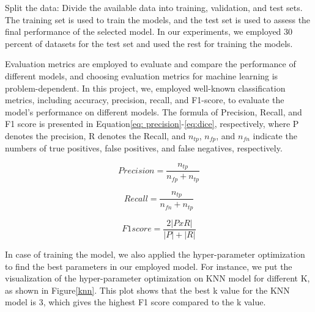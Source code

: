 \documentclass{article}
\begin{document}
 Split the data: Divide the available data into training, validation, and test sets. The training set is used to train the models, and the test set is used to assess the final performance of the selected model. In our experiments, we employed 30 percent of datasets for the test set and used the rest for training the models. 
 
 
 Evaluation metrics are employed to evaluate and compare the performance of different models, and choosing evaluation metrics for machine learning is problem-dependent. In this project, we, employed well-known classification metrics, including accuracy, precision, recall, and F1-score, to evaluate the model's performance on different models. The formula of Precision, Recall, and F1 score is presented in Equation\ref{eq: precision}-\ref{eq:dice}, respectively, where P denotes the precision, R denotes the Recall, and $n_{tp}$, $n_{fp}$, and $n_{fn}$ indicate the numbers of true positives, false positives, and false negatives, respectively.




 

 \begin{equation}\label{eq: precision}
Precision= \frac{n_{tp}}{ n_{fp}+ n_{tp}}
\end{equation}

\begin{equation}\label{eq: recall}
Recall=\frac{n_{tp}}{ n_{fn}+n_{tp}}
\end{equation}



\begin{equation}\label{eq:dice}
F1 score =\frac{2 |PxR|}{ |P| + |R| }
\end{equation}


 
 
 
 In case of training the model, we also applied the hyper-parameter optimization to find the best parameters in our employed model. For instance, we put the visualization of the hyper-parameter optimization on KNN model for different K, as shown in Figure\ref{knn}. This plot shows that the best k value for the KNN model is 3, which gives the highest F1 score compared to the k value.
 









\end{document}
